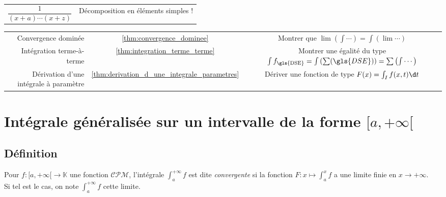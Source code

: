 \documentclass[11pt,a4paper,fleqn,pdftex]{report}
\begin{document}
\begin{methode}
\begin{tabulary}{\textwidth}{| c | C |}
     $\dfrac{1}{(x+a)\cdots(x+z)}$&Décomposition en éléments simples !\\
\end{tabulary}
\begin{tabulary}{\textwidth}{| r@{ - (} c @{) }| C |}
     Convergence dominée&\ref{thm:convergence_dominee}&Montrer que $\lim\left( \int \cdots\right) = \int \left( \lim \cdots\right) $\\
     \small{Intégration terme-à-terme}&\ref{thm:integration_terme_terme}&Montrer une égalité du type $\int f_\text{\gls{DSE}} = \int \left( \sum (\gls{DSE}) \right) = \sum \left( \int \cdots \right)$\\
     \small{Dérivation d'une intégrale à paramètre}&\ref{thm:derivation_d_une_integrale_parametres}&Dériver une fonction de type $F(x)=\int_I f(x,t)\d t$
\end{tabulary}
\end{methode}
\section{Intégrale généralisée sur un intervalle de la forme $[a,+\infty[$} %
\label{sec:integrale_generalisee}
\subsection{Définition} %
\label{sub:definition}
\begin{dfn}
    \label{dfn:integrale_convergente}
     Pour $f : [a,+\infty[ \to \mathbb{K}$ une fonction $\mathcal{CPM}$, l'intégrale $\int_a^{+\infty} f$ est dite \emph{convergente} si la fonction $F : x \mapsto \int_a^x f$ a une limite finie en $x\to +\infty$.\\
     Si tel est le cas, on note $\int_a^{+\infty} f$ cette limite.
\end{dfn}
\end{document}
